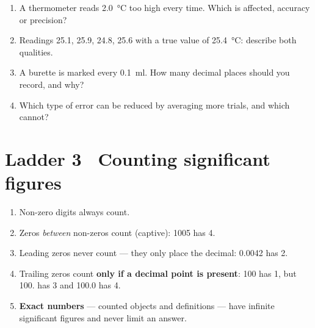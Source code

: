 \documentclass{apchem-worksheet}
\begin{document}
\begin{yourturn}
\begin{enumerate}[leftmargin=*,itemsep=0.5em]
  \item A thermometer reads \SI{2.0}{\celsius} too high every time. Which
        is affected, accuracy or precision? \workspace[1.2cm]
  \item Readings 25.1, 25.9, 24.8, 25.6 with a true value of
        \SI{25.4}{\celsius}: describe both qualities.
        \workspace[1.4cm]
  \item A burette is marked every \SI{0.1}{\milli\litre}. How many
        decimal places should you record, and why? \workspace[1.4cm]
  \item Which type of error can be reduced by averaging more trials, and
        which cannot? \workspace[1.4cm]
\end{enumerate}
\end{yourturn}

\section*{\sffamily Ladder 3 \textbullet\ Counting significant figures}

\begin{enumerate}[leftmargin=*,itemsep=0.15em]
  \item Non-zero digits always count.
  \item Zeros \emph{between} non-zeros count (captive): 1005 has 4.
  \item Leading zeros never count --- they only place the decimal:
        0.0042 has 2.
  \item Trailing zeros count \textbf{only if a decimal point is
        present}: 100 has 1, but 100. has 3 and 100.0 has 4.
  \item \textbf{Exact numbers} --- counted objects and definitions --- have
        infinite significant figures and never limit an answer.
\end{enumerate}
\end{document}
